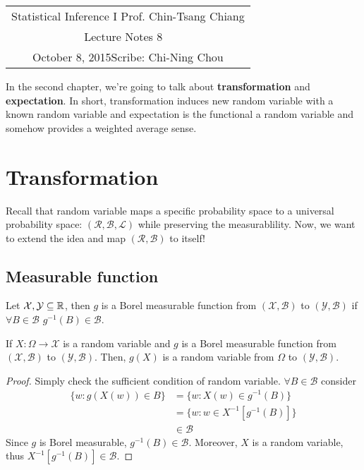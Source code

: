 \documentclass[11pt]{article}
\newcommand{\scribe}{Chi-Ning Chou}
\newcommand{\lecnum}{8}
\newcommand{\lecdate}{October 8, 2015}
\begin{document}
	
	\begin{center}
		\renewcommand{\arraystretch}{2}
		\begin{bfseries}
			\begin{tabular}{|c|}
				\hline
				Statistical Inference I \hfill Prof. Chin-Tsang Chiang\\
				\hspace{15em} {\large Lecture Notes \lecnum} \hspace{15em}\ \\
				\lecdate \hfill Scribe: \scribe\\
				\hline
			\end{tabular}
			\renewcommand{\arraystretch}{1}
		\end{bfseries}
	\end{center}
	
In the second chapter, we're going to talk about {\bf transformation} and {\bf expectation}. In short, transformation induces new random variable with a known random variable and expectation is the functional a random variable and somehow provides a weighted average sense.

\section{Transformation}
Recall that random variable maps a specific probability space to a universal probability space: $(\mathcal{R},\mathcal{B},\mathcal{L})$ while preserving the measurablility. Now, we want to extend the idea and map $(\mathcal{R},\mathcal{B})$ to itself!

\subsection{Measurable function}
\begin{definition}
	Let $\mathcal{X},\mathcal{Y}\subseteq{\mathbb R}$, then $g$ is a Borel measurable function from $(\mathcal{X},\mathcal{B})$ to $(\mathcal{Y},\mathcal{B})$ if $\forall B\in\mathcal{B}$ $g^{-1}(B)\in\mathcal{B}$.
\end{definition}

\begin{property}
	If $X:\Omega\rightarrow\mathcal{X}$ is a random variable and $g$ is a Borel measurable function from $(\mathcal{X},\mathcal{B})$ to $(\mathcal{Y},\mathcal{B})$. Then, $g(X)$ is a random variable from $\Omega$ to $(\mathcal{Y},\mathcal{B})$.
\end{property}
\begin{proof}
	Simply check the sufficient condition of random variable. $\forall B\in\mathcal{B}$ consider 
	\begin{align*}
	\{w:g(X(w))\in B \}&=\{w:X(w)\in g^{-1}(B) \}\\
	&= \{w:w\in X^{-1}[g^{-1}(B)] \}\\
	&\in\mathcal{B}
	\end{align*}
	Since $g$ is Borel measurable, $g^{-1}(B)\in\mathcal{B}$. Moreover, $X$ is a random variable, thus $X^{-1}[g^{-1}(B)]\in\mathcal{B}$.
\end{proof}
\end{document}
